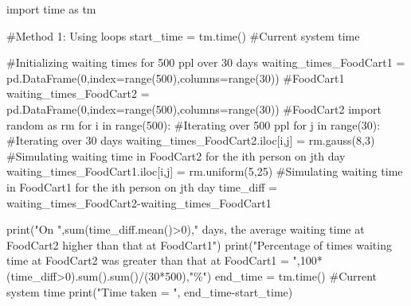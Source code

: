\documentclass[
  letterpaper,
  DIV=11,
  numbers=noendperiod]{scrreprt}
\newenvironment{Shaded}{\begin{snugshade}}{\end{snugshade}}
\newcommand{\BuiltInTok}[1]{\textcolor[rgb]{0.00,0.23,0.31}{#1}}
\newcommand{\CommentTok}[1]{\textcolor[rgb]{0.37,0.37,0.37}{#1}}
\newcommand{\ControlFlowTok}[1]{\textcolor[rgb]{0.00,0.23,0.31}{#1}}
\newcommand{\DecValTok}[1]{\textcolor[rgb]{0.68,0.00,0.00}{#1}}
\newcommand{\ImportTok}[1]{\textcolor[rgb]{0.00,0.46,0.62}{#1}}
\newcommand{\KeywordTok}[1]{\textcolor[rgb]{0.00,0.23,0.31}{#1}}
\newcommand{\NormalTok}[1]{\textcolor[rgb]{0.00,0.23,0.31}{#1}}
\newcommand{\OperatorTok}[1]{\textcolor[rgb]{0.37,0.37,0.37}{#1}}
\newcommand{\StringTok}[1]{\textcolor[rgb]{0.13,0.47,0.30}{#1}}
\begin{document}
\begin{Shaded}
\begin{Highlighting}[]
\ImportTok{import}\NormalTok{ time }\ImportTok{as}\NormalTok{ tm}
\end{Highlighting}
\end{Shaded}

\begin{Shaded}
\begin{Highlighting}[]
\CommentTok{\#Method 1: Using loops}
\NormalTok{start\_time }\OperatorTok{=}\NormalTok{ tm.time() }\CommentTok{\#Current system time}

\CommentTok{\#Initializing waiting times for 500 ppl over 30 days}
\NormalTok{waiting\_times\_FoodCart1 }\OperatorTok{=}\NormalTok{ pd.DataFrame(}\DecValTok{0}\NormalTok{,index}\OperatorTok{=}\BuiltInTok{range}\NormalTok{(}\DecValTok{500}\NormalTok{),columns}\OperatorTok{=}\BuiltInTok{range}\NormalTok{(}\DecValTok{30}\NormalTok{)) }\CommentTok{\#FoodCart1}
\NormalTok{waiting\_times\_FoodCart2 }\OperatorTok{=}\NormalTok{ pd.DataFrame(}\DecValTok{0}\NormalTok{,index}\OperatorTok{=}\BuiltInTok{range}\NormalTok{(}\DecValTok{500}\NormalTok{),columns}\OperatorTok{=}\BuiltInTok{range}\NormalTok{(}\DecValTok{30}\NormalTok{)) }\CommentTok{\#FoodCart2}
\ImportTok{import}\NormalTok{ random }\ImportTok{as}\NormalTok{ rm}
\ControlFlowTok{for}\NormalTok{ i }\KeywordTok{in} \BuiltInTok{range}\NormalTok{(}\DecValTok{500}\NormalTok{):  }\CommentTok{\#Iterating over 500 ppl}
    \ControlFlowTok{for}\NormalTok{ j }\KeywordTok{in} \BuiltInTok{range}\NormalTok{(}\DecValTok{30}\NormalTok{): }\CommentTok{\#Iterating over 30 days}
\NormalTok{        waiting\_times\_FoodCart2.iloc[i,j] }\OperatorTok{=}\NormalTok{ rm.gauss(}\DecValTok{8}\NormalTok{,}\DecValTok{3}\NormalTok{) }\CommentTok{\#Simulating waiting time in FoodCart2 for the ith person on jth day}
\NormalTok{        waiting\_times\_FoodCart1.iloc[i,j] }\OperatorTok{=}\NormalTok{ rm.uniform(}\DecValTok{5}\NormalTok{,}\DecValTok{25}\NormalTok{) }\CommentTok{\#Simulating waiting time in FoodCart1 for the ith person on jth day}
\NormalTok{time\_diff }\OperatorTok{=}\NormalTok{ waiting\_times\_FoodCart2}\OperatorTok{{-}}\NormalTok{waiting\_times\_FoodCart1}

\BuiltInTok{print}\NormalTok{(}\StringTok{"On "}\NormalTok{,}\BuiltInTok{sum}\NormalTok{(time\_diff.mean()}\OperatorTok{\textgreater{}}\DecValTok{0}\NormalTok{),}\StringTok{" days, the average waiting time at FoodCart2 higher than that at FoodCart1"}\NormalTok{)}
\BuiltInTok{print}\NormalTok{(}\StringTok{"Percentage of times waiting time at FoodCart2 was greater than that at FoodCart1 = "}\NormalTok{,}\DecValTok{100}\OperatorTok{*}\NormalTok{(time\_diff}\OperatorTok{\textgreater{}}\DecValTok{0}\NormalTok{).}\BuiltInTok{sum}\NormalTok{().}\BuiltInTok{sum}\NormalTok{()}\OperatorTok{/}\NormalTok{(}\DecValTok{30}\OperatorTok{*}\DecValTok{500}\NormalTok{),}\StringTok{"\%"}\NormalTok{)}
\NormalTok{end\_time }\OperatorTok{=}\NormalTok{ tm.time() }\CommentTok{\#Current system time}
\BuiltInTok{print}\NormalTok{(}\StringTok{"Time taken = "}\NormalTok{, end\_time}\OperatorTok{{-}}\NormalTok{start\_time)}
\end{Highlighting}
\end{Shaded}
\end{document}
